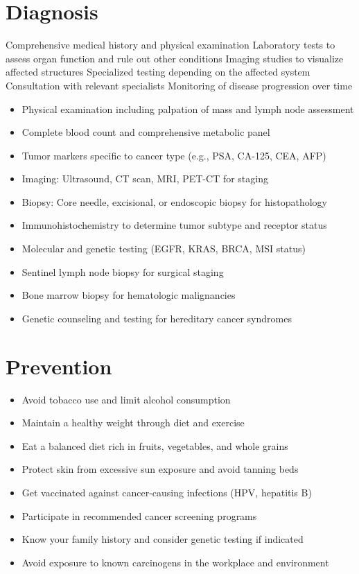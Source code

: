 \section{Diagnosis}
Comprehensive medical history and physical examination Laboratory tests to assess organ function and rule out other conditions Imaging studies to visualize affected structures Specialized testing depending on the affected system Consultation with relevant specialists Monitoring of disease progression over time

\begin{itemize}[noitemsep]
  \item Physical examination including palpation of mass and lymph node assessment
  \item Complete blood count and comprehensive metabolic panel
  \item Tumor markers specific to cancer type (e.g., PSA, CA-125, CEA, AFP)
  \item Imaging: Ultrasound, CT scan, MRI, PET-CT for staging
  \item Biopsy: Core needle, excisional, or endoscopic biopsy for histopathology
  \item Immunohistochemistry to determine tumor subtype and receptor status
  \item Molecular and genetic testing (EGFR, KRAS, BRCA, MSI status)
  \item Sentinel lymph node biopsy for surgical staging
  \item Bone marrow biopsy for hematologic malignancies
  \item Genetic counseling and testing for hereditary cancer syndromes
\end{itemize}
\section{Prevention}
\begin{itemize}[noitemsep]
  \item Avoid tobacco use and limit alcohol consumption
  \item Maintain a healthy weight through diet and exercise
  \item Eat a balanced diet rich in fruits, vegetables, and whole grains
  \item Protect skin from excessive sun exposure and avoid tanning beds
  \item Get vaccinated against cancer-causing infections (HPV, hepatitis B)
  \item Participate in recommended cancer screening programs
  \item Know your family history and consider genetic testing if indicated
  \item Avoid exposure to known carcinogens in the workplace and environment
\end{itemize}
